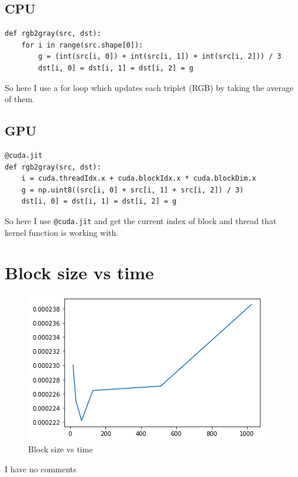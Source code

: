 \documentclass{article}
\begin{document}
\subsection{CPU}

\begin{verbatim}
def rgb2gray(src, dst):
    for i in range(src.shape[0]):
        g = (int(src[i, 0]) + int(src[i, 1]) + int(src[i, 2])) / 3
        dst[i, 0] = dst[i, 1] = dst[i, 2] = g
\end{verbatim}

So here I use a for loop which updates each triplet (RGB) by taking the average of them.

\subsection{GPU}

\begin{verbatim}
@cuda.jit
def rgb2gray(src, dst):
    i = cuda.threadIdx.x + cuda.blockIdx.x * cuda.blockDim.x
    g = np.uint8((src[i, 0] + src[i, 1] + src[i, 2]) / 3)
    dst[i, 0] = dst[i, 1] = dst[i, 2] = g
\end{verbatim}

So here I use \texttt{@cuda.jit} and get the current index of block and thread that kernel function is working with.

\section{Block size vs time}

\begin{figure}[htbp]
    \centering
    \includegraphics[scale=0.8]{block_size_vs_time.png}
    \caption{Block size vs time}
    \label{fig:block_size_vs_time}
\end{figure}

I have no comments
\end{document}

